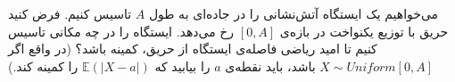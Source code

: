 \problem{}
می‌خواهیم یک ایستگاه آتش‌نشانی را در جاده‌ای به طول \( A \)
 تاسیس کنیم. فرض کنید حریق با توزیع یکنواخت
 در بازه‌ی \([0, A]\) رخ می‌دهد. ایستگاه را در چه مکانی تاسیس کنیم تا
  امید ریاضی فاصله‌ی ایستگاه از حریق، کمینه باشد؟ (در واقع اگر \( X \sim {Uniform}[0, A] \) باشد،
   باید نقطه‌ی \( a \) را بیابید که \( \mathbb{E}(|X - a|) \) را کمینه کند.)